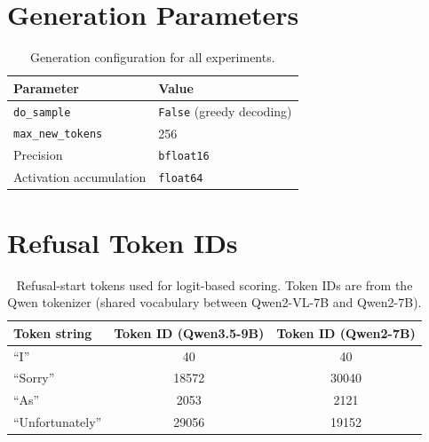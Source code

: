 \documentclass[11pt,a4paper]{article}
\begin{document}
\section{Generation Parameters}

\begin{table}[H]\centering
\caption{Generation configuration for all experiments.}
\begin{tabular}{ll}
\toprule
\textbf{Parameter} & \textbf{Value} \\
\midrule
\texttt{do\_sample} & \texttt{False} (greedy decoding) \\
\texttt{max\_new\_tokens} & 256 \\
Precision & \texttt{bfloat16} \\
Activation accumulation & \texttt{float64} \\
\bottomrule
\end{tabular}
\end{table}

\section{Refusal Token IDs}

\begin{table}[H]\centering
\caption{Refusal-start tokens used for logit-based scoring. Token IDs are from the Qwen tokenizer (shared vocabulary between Qwen2-VL-7B and Qwen2-7B).}
\begin{tabular}{lcc}
\toprule
\textbf{Token string} & \textbf{Token ID (Qwen3.5-9B)} & \textbf{Token ID (Qwen2-7B)} \\
\midrule
``I'' & 40 & 40 \\
``Sorry'' & 18572 & 30040 \\
``As'' & 2053 & 2121 \\
``Unfortunately'' & 29056 & 19152 \\
\bottomrule
\end{tabular}
\end{table}
\end{document}
